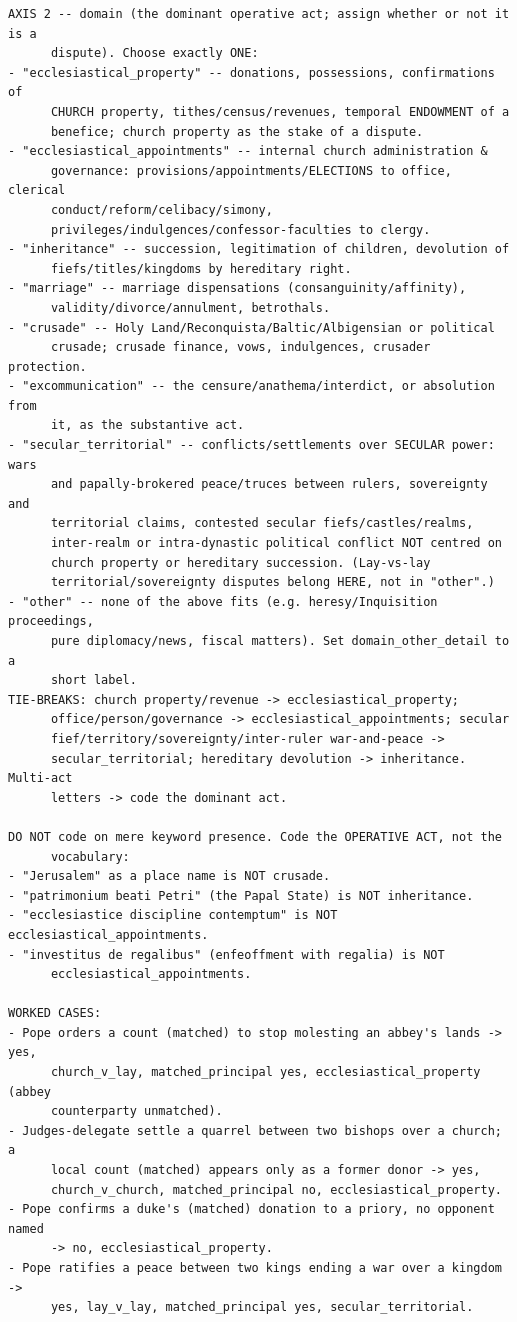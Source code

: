 \documentclass[12pt]{article}
\theoremstyle{definition}
\theoremstyle{remark}
\begin{document}
{\begin{verbatim}
AXIS 2 -- domain (the dominant operative act; assign whether or not it is a
      dispute). Choose exactly ONE:
- "ecclesiastical_property" -- donations, possessions, confirmations of
      CHURCH property, tithes/census/revenues, temporal ENDOWMENT of a
      benefice; church property as the stake of a dispute.
- "ecclesiastical_appointments" -- internal church administration &
      governance: provisions/appointments/ELECTIONS to office, clerical
      conduct/reform/celibacy/simony,
      privileges/indulgences/confessor-faculties to clergy.
- "inheritance" -- succession, legitimation of children, devolution of
      fiefs/titles/kingdoms by hereditary right.
- "marriage" -- marriage dispensations (consanguinity/affinity),
      validity/divorce/annulment, betrothals.
- "crusade" -- Holy Land/Reconquista/Baltic/Albigensian or political
      crusade; crusade finance, vows, indulgences, crusader protection.
- "excommunication" -- the censure/anathema/interdict, or absolution from
      it, as the substantive act.
- "secular_territorial" -- conflicts/settlements over SECULAR power: wars
      and papally-brokered peace/truces between rulers, sovereignty and
      territorial claims, contested secular fiefs/castles/realms,
      inter-realm or intra-dynastic political conflict NOT centred on
      church property or hereditary succession. (Lay-vs-lay
      territorial/sovereignty disputes belong HERE, not in "other".)
- "other" -- none of the above fits (e.g. heresy/Inquisition proceedings,
      pure diplomacy/news, fiscal matters). Set domain_other_detail to a
      short label.
TIE-BREAKS: church property/revenue -> ecclesiastical_property;
      office/person/governance -> ecclesiastical_appointments; secular
      fief/territory/sovereignty/inter-ruler war-and-peace ->
      secular_territorial; hereditary devolution -> inheritance. Multi-act
      letters -> code the dominant act.

DO NOT code on mere keyword presence. Code the OPERATIVE ACT, not the
      vocabulary:
- "Jerusalem" as a place name is NOT crusade.
- "patrimonium beati Petri" (the Papal State) is NOT inheritance.
- "ecclesiastice discipline contemptum" is NOT ecclesiastical_appointments.
- "investitus de regalibus" (enfeoffment with regalia) is NOT
      ecclesiastical_appointments.

WORKED CASES:
- Pope orders a count (matched) to stop molesting an abbey's lands -> yes,
      church_v_lay, matched_principal yes, ecclesiastical_property (abbey
      counterparty unmatched).
- Judges-delegate settle a quarrel between two bishops over a church; a
      local count (matched) appears only as a former donor -> yes,
      church_v_church, matched_principal no, ecclesiastical_property.
- Pope confirms a duke's (matched) donation to a priory, no opponent named
      -> no, ecclesiastical_property.
- Pope ratifies a peace between two kings ending a war over a kingdom ->
      yes, lay_v_lay, matched_principal yes, secular_territorial.


\end{verbatim}}
\end{document}

